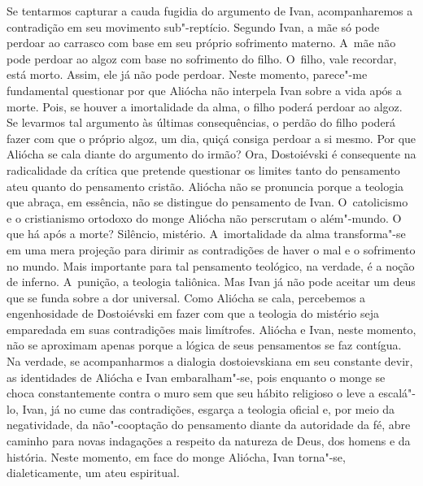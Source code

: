 Se tentarmos capturar a cauda fugidia do argumento de Ivan,
acompanharemos a contradição em seu movimento sub"-reptício. Segundo
Ivan, a mãe só pode perdoar ao carrasco com base em seu próprio
sofrimento materno. A~mãe não pode perdoar ao algoz com base no
sofrimento do filho. O~filho, vale recordar, está morto. Assim, ele já
não pode perdoar. Neste momento, parece"-me fundamental questionar por
que Aliócha não interpela Ivan sobre a vida após a morte. Pois, se
houver a imortalidade da alma, o filho poderá perdoar ao algoz. Se
levarmos tal argumento às últimas consequências, o perdão do filho
poderá fazer com que o próprio algoz, um dia, quiçá consiga perdoar a si
mesmo. Por que Aliócha se cala diante do argumento do irmão? Ora,
Dostoiévski é consequente na radicalidade da crítica que pretende
questionar os limites tanto do pensamento ateu quanto do pensamento
cristão. Aliócha não se pronuncia porque a teologia que abraça, em
essência, não se distingue do pensamento de Ivan. O~catolicismo e o
cristianismo ortodoxo do monge Aliócha não perscrutam o além"-mundo. O
que há após a morte? Silêncio, mistério. A~imortalidade da alma
transforma"-se em uma mera projeção para dirimir as contradições de haver
o mal e o sofrimento no mundo. Mais importante para tal pensamento
teológico, na verdade, é a noção de inferno. A~punição, a teologia
taliônica. Mas Ivan já não pode aceitar um deus que se funda sobre a dor
universal. Como Aliócha se cala, percebemos a engenhosidade de
Dostoiévski em fazer com que a teologia do mistério seja emparedada em
suas contradições mais limítrofes. Aliócha e Ivan, neste momento, não se
aproximam apenas porque a lógica de seus pensamentos se faz contígua. Na
verdade, se acompanharmos a dialogia dostoievskiana em seu constante
devir, as identidades de Aliócha e Ivan embaralham"-se, pois enquanto o
monge se choca constantemente contra o muro sem que seu hábito religioso
o leve a escalá"-lo, Ivan, já no cume das contradições, esgarça a
teologia oficial e, por meio da negatividade, da não"-cooptação do
pensamento diante da autoridade da fé, abre caminho para novas
indagações a respeito da natureza de Deus, dos homens e da história.
Neste momento, em face do monge Aliócha, Ivan torna"-se, dialeticamente,
um ateu espiritual.

